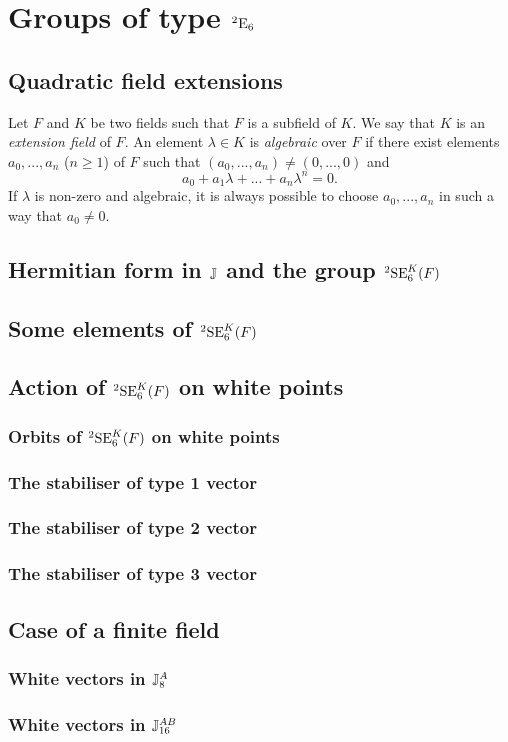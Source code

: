 \chapter{Groups of type ${}^2\mathord{\mathrm{E}}_6$}
\ifpdf
    \graphicspath{{Chapter3/Chapter3Figs/PNG/}{Chapter3/Chapter3Figs/PDF/}{Chapter3/Chapter3Figs/}}
\else
    \graphicspath{{Chapter3/Chapter3Figs/EPS/}{Chapter3/Chapter3Figs/}}
\fi

\section{Quadratic field extensions}

Let $F$ and $K$ be two fields such that $F$ is a subfield of $K$. We say that 
$K$ is an \textit{extension field} of $F$. An element $\lambda \in K$ is \textit{algebraic}
over $F$ if there exist elements $a_0, ..., a_n$ ($n \geqslant 1$) of $F$ such 
that $(a_0, ..., a_n) \neq (0, ..., 0)$ and 
\begin{equation}
a_0 + a_1 \lambda + ... + a_n \lambda^n = 0.
\end{equation}
If $\lambda$ is non-zero and algebraic, it is always possible to choose $a_0, ..., a_n$ in such
a way that $a_0 \neq 0$.



\section{Hermitian form in $\mathbb{J}$ and the group ${}^2\mathrm{SE}_6^K(F)$}

\section{Some elements of ${}^2\mathrm{SE}_6^K(F)$}

\section{Action of ${}^2\mathrm{SE}_6^K(F)$ on white points}

\subsection{Orbits of ${}^2\mathrm{SE}_6^K(F)$ on white points}
\subsection{The stabiliser of type 1 vector}
\subsection{The stabiliser of type 2 vector}
\subsection{The stabiliser of type 3 vector}

\section{Case of a finite field}
\subsection{White vectors in $\mathbb{J}_8^A$}
\subsection{White vectors in $\mathbb{J}_{16}^{AB}$}



